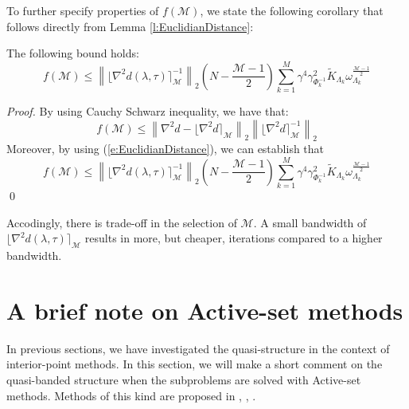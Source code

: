 To further specify properties of $f(\mathcal{M})$, we state the following corollary that follows directly from Lemma \ref{l:EuclidianDistance}:
\begin{corollary}
The following bound holds:
\begin{equation}
f(\mathcal{M}) \leq \left\| \lfloor \nabla^2 d(\lambda, \tau) \rceil_{\mathcal{M}}^{-1} \right\|_2 \left( N -\frac{\mathcal{M} - 1}{2} \right) \sum_{k=1}^M \gamma^4 \gamma_{\Phi_k^{-1}}^2 \tilde{K}_{\Lambda_k} \omega_{\Lambda_k}^{\frac{\mathcal{M} - 1}{2}}
\end{equation}
\end{corollary}
\begin{proof}
By using Cauchy Schwarz inequality, we have that:
\begin{equation}
f(\mathcal{M}) \leq \left\| \nabla^2 d -  \lfloor \nabla^2 d \rceil_{\mathcal{M}} \right\|_2  \left\|  \lfloor \nabla^2 d \rceil_{\mathcal{M}}^{-1} \right\|_2
\end{equation}
Moreover, by using (\ref{e:EuclidianDistance}), we can establish that
\begin{equation}
f(\mathcal{M}) \leq \left\| \lfloor \nabla^2 d(\lambda, \tau) \rceil_{\mathcal{M}}^{-1} \right\|_2 \left( N -\frac{\mathcal{M} - 1}{2} \right) \sum_{k=1}^M \gamma^4 \gamma_{\Phi_k^{-1}}^2 \tilde{K}_{\Lambda_k} \omega_{\Lambda_k}^{\frac{\mathcal{M} - 1}{2}}
\end{equation}
\qed
\end{proof}

Accodingly, there is trade-off in the selection of $\mathcal{M}$. A small bandwidth of $\lfloor \nabla^2 d(\lambda, \tau) \rceil_{\mathcal{M}}$ results in more, but cheaper, iterations compared to a higher bandwidth.

\section{A brief note on Active-set methods} \label{S:ActiveSet}

In previous sections, we have investigated the quasi-structure in the context of interior-point methods. In this section, we will make a short comment on the quasi-banded structure when the subproblems are solved with Active-set methods. Methods of this kind are proposed in  \cite{Ferreau2012b}, \cite{Kozma2013a}, \cite{Kozma2014a}.

